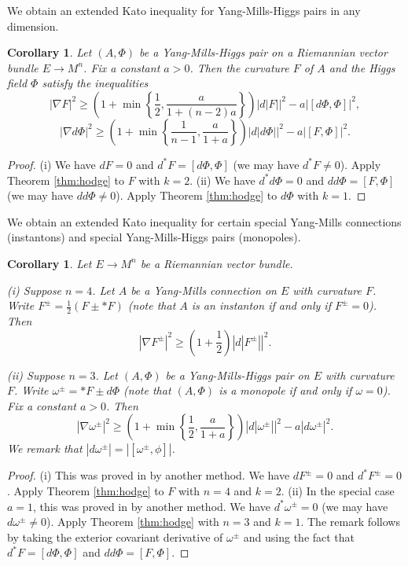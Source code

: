 \documentclass[12pt]{amsart} %
\newtheorem{corollary}[theorem]{Corollary}
\theoremstyle{definition}
\numberwithin{equation}{section}
\newcommand{\ra}{\rightarrow}
\begin{document}
We obtain an extended Kato inequality for Yang-Mills-Higgs pairs in
any dimension.
\begin{corollary}
Let $\left(A,\Phi\right)$ be a Yang-Mills-Higgs pair on a Riemannian vector bundle $E \ra M^n$. Fix a constant $a>0$. Then the curvature $F$ of $A$ and the Higgs field $\Phi$ satisfy the inequalities
\[
\left|\nabla F\right|^{2}\geq\left(1+\min\left\{ \frac{1}{2},\frac{a}{1+\left(n-2\right)a}\right\} \right)\left|d\left|F\right|\right|^{2}-a\left|\left[d\Phi,\Phi\right]\right|^{2},
\]
\[
\left|\nabla d\Phi\right|^{2}\geq\left(1+\min\left\{ \frac{1}{n-1},\frac{a}{1+a}\right\} \right)\left|d\left|d\Phi\right|\right|^{2}-a\left|\left[F,\Phi\right]\right|^{2}.
\]
\end{corollary}
\begin{proof}
(i) We have $dF=0$ and $d^{*}F=\left[d\Phi,\Phi\right]$ (we may
have $d^{*}F\neq0$). Apply Theorem \ref{thm:hodge} to $F$ with
$k=2$. (ii) We have $d^{*}d\Phi=0$ and $dd\Phi=\left[F,\Phi\right]$
(we may have $dd\Phi\neq0$). Apply Theorem \ref{thm:hodge} to $d\Phi$
with $k=1$.
\end{proof}
We obtain an extended Kato inequality for certain special Yang-Mills
connections (instantons) and special Yang-Mills-Higgs pairs (monopoles).
\begin{corollary}
Let $E \ra M^n$ be a Riemannian vector bundle.

(i) Suppose $n=4$. Let $A$ be a Yang-Mills connection on $E$ with curvature $F$. Write $F^{\pm}=\frac{1}{2}\left(F\pm*F\right)$
(note that $A$ is an instanton if and only if $F^{\pm}=0$). Then
\[
\left|\nabla F^{\pm}\right|^{2}\geq\left(1+\frac{1}{2}\right)\left|d\left|F^{\pm}\right|\right|^{2}.
\]

(ii) Suppose $n=3$. Let $\left(A,\Phi\right)$ be a Yang-Mills-Higgs
pair on $E$ with curvature $F$. Write $\omega^ {\pm}=*F\pm d\Phi$
(note that $\left(A,\Phi\right)$ is a monopole if and only if $\omega=0$).
Fix a constant $a>0$. Then
\[
|\nabla\omega^ {\pm}|^{2}\geq\left(1+\min\left\{ \frac{1}{2},\frac{a}{1+a}\right\} \right)\left|d\left|\omega^{\pm}\right|\right|^{2}-a\left|d\omega^ {\pm}\right|^{2}.
\]
We remark that $|d\omega^\pm| = |[\omega^\pm,\phi]|$.
\end{corollary}
\begin{proof}
(i) This was proved in \cite{GKS2018} by another method. We have
$dF^{\pm}=0$ and $d^{*}F^{\pm}=0$. Apply Theorem \ref{thm:hodge}
to $F$ with $n=4$ and $k=2$. (ii) In the special case $a=1$, this was
proved in \cite{F2023} by another method. We have $d^{*}\omega^ {\pm}=0$
(we may have $d\omega^ {\pm}\neq0$). Apply Theorem \ref{thm:hodge} with
$n=3$ and $k=1$. The remark follows by taking the exterior covariant derivative of $\omega^\pm$ and using the fact that $d^{*}F=\left[d\Phi,\Phi\right]$ and $dd\Phi=\left[F,\Phi\right]$.
\end{proof}
\end{document}
